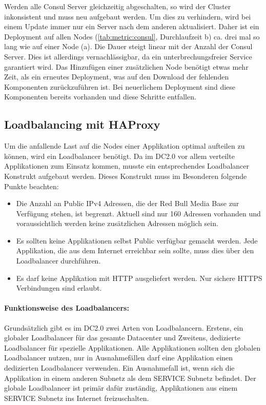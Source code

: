 Werden alle Consul Server gleichzeitig abgeschalten, so wird der Cluster inkonsistent und muss neu aufgebaut werden. Um dies zu verhindern, wird bei einem Update immer nur ein Server nach dem anderen aktualisiert. Daher ist ein Deployment auf allen Nodes (\autoref{tab:metric:consul}, Durchlaufzeit b) ca. drei mal so lang wie auf einer Node (a). Die Dauer steigt linear mit der Anzahl der Consul Server. Dies ist allerdings vernachlässigbar, da ein unterbrechungsfreier Service garantiert wird. Das Hinzufügen einer zusätzlichen Node benötigt etwas mehr Zeit, als ein erneutes Deployment, was auf den Download der fehlenden Komponenten zurückzuführen ist. Bei neuerlichem Deployment sind diese Komponenten bereits vorhanden und diese Schritte entfallen.


\subsection{Loadbalancing mit HAProxy}
\label{sec:loadbalancer}
Um die anfallende Last auf die Nodes einer Applikation optimal aufteilen zu können, wird ein Loadbalancer benötigt. Da im DC2.0 vor allem verteilte Applikationen zum Einsatz kommen, musste ein entsprechendes Loadbalancer Konstrukt aufgebaut werden. Dieses Konstrukt muss im Besonderen folgende Punkte beachten:
\begin{itemize}
	\item Die Anzahl an Public IPv4 Adressen, die der Red Bull Media Base zur Verfügung stehen, ist begrenzt. Aktuell sind nur 160 Adressen vorhanden und voraussichtlich werden keine zusätzlichen Adressen möglich sein.
	\item Es sollten keine Applikationen selbst Public verfügbar gemacht werden. Jede Applikation, die aus dem Internet erreichbar sein sollte, muss dies über den Loadbalancer durchführen.
	\item Es darf keine Applikation mit HTTP ausgeliefert werden. Nur sichere HTTPS Verbindungen sind erlaubt. 
\end{itemize}

\paragraph{Funktionsweise des Loadbalancers:}
Grundsätzlich gibt es im DC2.0 zwei Arten von Loadbalancern. Erstens, ein globaler Loadbalancer für das gesamte Datacenter und Zweitens, dedizierte Loadbalancer für spezielle Applikationen. Alle Applikationen sollten den globalen Loadbalancer nutzen, nur in Ausnahmefällen darf eine Applikation einen dedizierten Loadbalancer verwenden. Ein Ausnahmefall ist, wenn sich die Applikation in einem anderen Subnetz als dem SERVICE Subnetz befindet. Der globale Loadbalancer ist primär dafür zuständig, Applikationen aus einem SERVICE Subnetz ins Internet freizuschalten.

